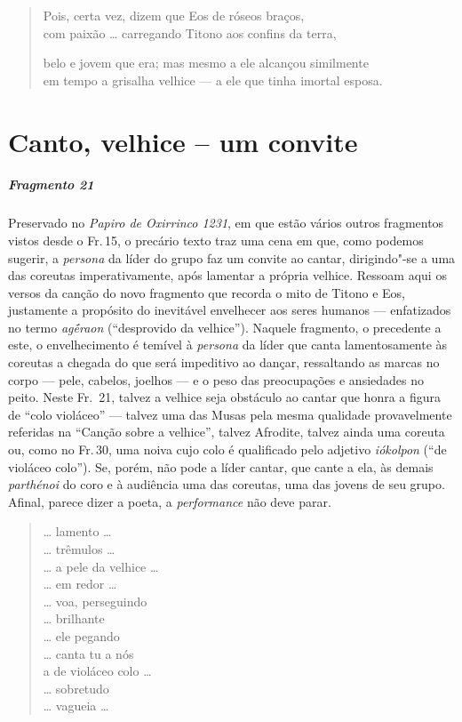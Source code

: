 {\begin{verse}
Pois, certa vez, dizem que Eos de róseos braços,\\
com paixão \ldots{} carregando Titono aos confins da \qb{}terra,

belo e jovem que era; mas mesmo a ele alcançou \qb{}similmente\\
em tempo a grisalha velhice --- a ele que tinha \qb{}imortal esposa.
\end{verse}

\chapter{Canto, velhice -- um convite}


\paragraph{Fragmento 21}

{\small Preservado no \emph{Papiro de Oxirrinco 1231}, em que estão vários
outros fragmentos vistos desde o Fr.\,15, o precário texto traz uma
cena em que, como podemos sugerir, a \emph{persona} da líder do grupo
faz um convite ao cantar, dirigindo"-se a uma das coreutas
imperativamente, após lamentar a própria velhice. Ressoam aqui os versos
da canção do novo fragmento que recorda o mito de Titono e Eos,
justamente a propósito do inevitável envelhecer aos seres humanos ---
enfatizados no termo \emph{agḗraon} (``desprovido da velhice'').
Naquele fragmento, o precedente a este, o envelhecimento é temível à \emph{persona} da líder que canta lamentosamente às
coreutas a chegada do que será impeditivo ao dançar, ressaltando as
marcas no corpo --- pele, cabelos, joelhos --- e o peso das
preocupações e ansiedades no peito. Neste Fr.~21, talvez a
velhice seja obstáculo ao cantar que honra a figura de ``colo violáceo''
--- talvez uma das Musas pela mesma qualidade provavelmente referidas na
``Canção sobre a velhice'', talvez Afrodite, talvez ainda uma coreuta
ou, como no Fr.\,30, uma noiva cujo colo é qualificado pelo adjetivo \textit{iókolpon} (``de violáceo colo''). Se, porém, não pode a líder cantar, que
cante a ela, às demais \emph{parthénoi} do coro e à audiência uma das
coreutas, uma das jovens de seu grupo. Afinal, parece dizer a poeta, a
\emph{performance} não deve parar.}

\pagebreak

\begin{verse}
\ldots{} lamento \ldots{}\\
\ldots{} trêmulos \ldots{}\\
\ldots{} a pele da velhice \ldots{}\\
\ldots{} em redor \ldots{}\\
\ldots{} voa, perseguindo\\
\ldots{} brilhante\\
\ldots{} ele pegando\\
\ldots{} canta tu a nós\\
a de violáceo colo \ldots{}\\
\ldots{} sobretudo\\
\ldots{} vagueia \ldots{}
\end{verse}


}
